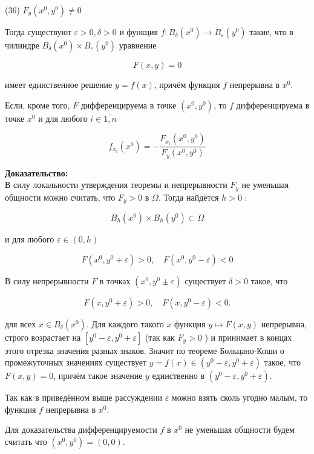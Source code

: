 \documentclass[a4paper,12pt]{article} %
\begin{document}
(36) $F_{y}\left(x^{0}, y^{0}\right) \neq 0$

Тогда существуют $\varepsilon>0, \delta>0$ и функция $f: B_{\delta}\left(x^{0}\right) \rightarrow B_{\varepsilon}\left(y^{0}\right)$ такие, что в чилиндре $B_{\delta}\left(x^{0}\right) \times B_{\varepsilon}\left(y^{0}\right)$ уравнение

$$
F(x, y)=0
$$

имеет единственное решение $y=f(x)$, причём функция $f$ непрерывна в $x^{0}$.

Если, кроме того, $F$ дифференцируема в точке $\left(x^{0}, y^{0}\right)$, то $f$ дифференцируема в точке $x^{0}$ и для любого $i \in \overline{1, n}$

$$
f_{x_{i}}\left(x^{0}\right)=-\frac{F_{x_{i}}\left(x^{0}, y^{0}\right)}{F_{y}\left(x^{0}, y^{0}\right)}
$$

\textbf{Доказательство:}\\
В силу локальности утверждения теоремы и непрерывности $F_{y}$ не уменьшая общности можно считать, что $F_{y}>0$ в $\Omega$. Тогда найдётся $h>0$ :

$$
B_{h}\left(x^{0}\right) \times B_{h}\left(y^{0}\right) \subset \Omega
$$

и для любого $\varepsilon \in(0, h)$

$$
F\left(x^{0}, y^{0}+\varepsilon\right)>0, \quad F\left(x^{0}, y^{0}-\varepsilon\right)<0
$$

В силу непрерывности $F$ в точках $\left(x^{0}, y^{0} \pm \varepsilon\right)$ существует $\delta>0$ такое, что

$$
F\left(x, y^{0}+\varepsilon\right)>0, \quad F\left(x, y^{0}-\varepsilon\right)<0 .
$$

для всех $x \in B_{\delta}\left(x^{0}\right)$. Для каждого такого $x$ функция $y \mapsto F(x, y)$ непрерывна, строго возрастает на $\left[y^{0}-\varepsilon, y^{0}+\varepsilon\right]$ (так как $F_{y}>0$ ) и принимает в концах этого отрезка значения разных знаков. Значит по теореме Больцано-Коши о промежуточных значениях существует $y=f(x) \in\left(y^{0}-\varepsilon, y^{0}+\varepsilon\right)$ такое, что $F(x, y)=0$, причём такое значение $y$ единственно в $\left(y^{0}-\varepsilon, y^{0}+\varepsilon\right)$.

Так как в приведённом выше рассуждении $\varepsilon$ можно взять сколь угодно малым, то функция $f$ непрерывна в $x^{0}$.

Для доказательства дифференцируемости $f$ в $x^{0}$ не уменьшая общности будем считать что $\left(x^{0}, y^{0}\right)=(0,0)$.
\end{document}
